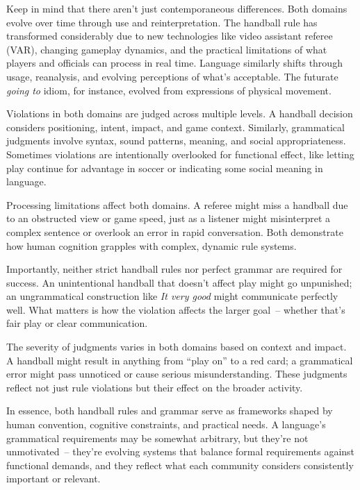 Keep in mind that there aren't just contemporaneous differences. Both domains evolve over time through use and reinterpretation. The handball rule has transformed considerably due to new technologies like video assistant referee (VAR), changing gameplay dynamics, and the practical limitations of what players and officials can process in real time. Language similarly shifts through usage, reanalysis, and evolving perceptions of what's acceptable. The futurate \textit{going to} idiom, for instance, evolved from expressions of physical movement.

Violations in both domains are judged across multiple levels. A handball decision considers positioning, intent, impact, and game context. Similarly, grammatical judgments involve syntax, sound patterns, meaning, and social appropriateness. Sometimes violations are intentionally overlooked for functional effect, like letting play continue for advantage in soccer or indicating some social meaning in language.

Processing limitations affect both domains. A referee might miss a handball due to an obstructed view or game speed, just as a listener might misinterpret a complex sentence or overlook an error in rapid conversation. Both demonstrate how human cognition grapples with complex, dynamic rule systems.

Importantly, neither strict handball rules nor perfect grammar are required for success. An unintentional handball that doesn't affect play might go unpunished; an ungrammatical construction like \textit{It very good} might communicate perfectly well. What matters is how the violation affects the larger goal~-- whether that's fair play or clear communication.

The severity of judgments varies in both domains based on context and impact. A handball might result in anything from ``play on'' to a red card; a grammatical error might pass unnoticed or cause serious misunderstanding. These judgments reflect not just rule violations but their effect on the broader activity.

In essence, both handball rules and grammar serve as frameworks shaped by human convention, cognitive constraints, and practical needs. A language's grammatical requirements may be somewhat arbitrary, but they're not unmotivated~-- they're evolving systems that balance formal requirements against functional demands, and they reflect what each community considers consistently important or relevant.

